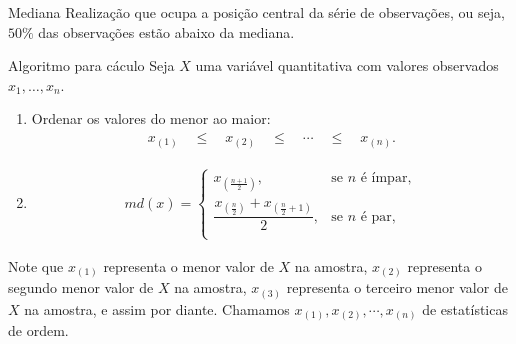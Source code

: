 \documentclass[8pt]{beamer}
\begin{document}
\begin{frame}{}
  \begin{block}{Mediana}
   Realização que ocupa a posição central da série de observações, ou seja, $50\%$ das observações estão abaixo da mediana.
  \end{block}

  \begin{block}{Algoritmo para cáculo}
  Seja $X$ uma variável quantitativa com valores observados $x_1, \dots, x_n$.
  \begin{enumerate}[1)]
   \item Ordenar os valores  do menor ao maior:
   \begin{align*}
    x_{(1)} \quad \leq \quad x_{(2)} \quad \leq \quad \cdots \quad \leq \quad x_{(n)}.
   \end{align*}
   \item \begin{align*}
          md(x) = \begin{cases}
                   x_{\left( \frac{n+1}{2}\right)}, & \mbox{se } n \mbox{ é ímpar},\\
                  \dfrac{ x_{\left( \frac{n}{2}\right)}+x_{\left( \frac{n}{2}+1\right)} }{2}, & \mbox{se } n \mbox{ é par},\\
                  \end{cases}
         \end{align*}

  \end{enumerate}
  \end{block}
  Note que $x_{(1)}$ representa o menor valor de $X$ na amostra, $x_{(2)}$ representa o segundo menor valor de $X$ na amostra, $x_{(3)}$ representa o terceiro menor valor de $X$ na amostra, e assim por 
  diante. Chamamos $x_{(1)}, x_{(2)}, \cdots, x_{(n)}$ de estatísticas de ordem.
\end{frame}
\end{document}
